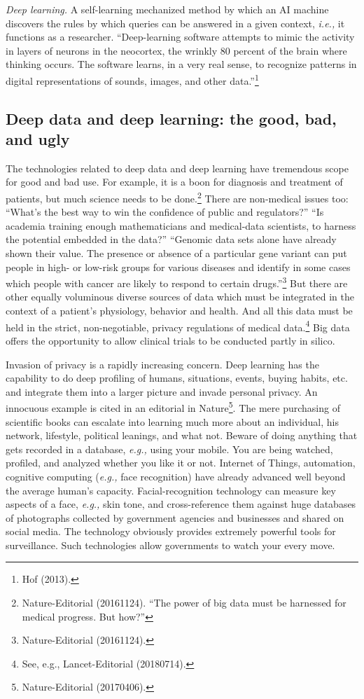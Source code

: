 \begin{multicols}{2}
\textit{Deep learning.} A self-learning mechanized method by which an AI machine discovers the rules by which queries can be answered in a given context, \textit{i.e.,} it functions as a researcher. “Deep-learning software attempts to mimic the activity in layers of neurons in the neocortex, the wrinkly 80 percent of the brain where thinking occurs. The software learns, in a very real sense, to recognize patterns in digital representations of sounds, images, and other data.”\footnote{Hof (2013).}

\subsection*{Deep data and deep learning: the good, bad, and ugly}

\vskip -4pt

The technologies related to deep data and deep learning have tremendous scope for good and bad use. For example, it is a boon for diagnosis and treatment of patients, but much science needs to be done.\footnote{Nature-Editorial (20161124). “The power of big data must be harnessed for medical progress. But how?”}  There are non-medical issues too: “What's the best way to win the confidence of public and regulators?” “Is academia training enough mathematicians and medical-data scientists, to harness the potential embedded in the data?” “Genomic data sets alone have already shown their value. The presence or absence of a particular gene variant can put people in high- or low-risk groups for various diseases and identify in some cases which people with cancer are likely to respond to certain drugs.”\footnote{Nature-Editorial (20161124).}  But there are other equally voluminous diverse sources of data which must be integrated in the context of a patient's physiology, behavior and health. And all this data must be held in the strict, non-negotiable, privacy regulations of medical data.\footnote{See, e.g., Lancet-Editorial (20180714).}  Big data offers the opportunity to allow clinical trials to be conducted partly in silico.

Invasion of privacy is a rapidly increasing concern. Deep learning has the capability to do deep profiling of humans, situations, events, buying habits, etc. and integrate them into a larger picture and invade personal privacy. An innocuous example is cited in an editorial in Nature\footnote{Nature-Editorial (20170406).}. The mere purchasing of scientific books can escalate into learning much more about an individual, his network, lifestyle, political leanings, and what not. Beware of doing anything that gets recorded in a database, \textit{e.g.,} using your mobile. You are being watched, profiled, and analyzed whether you like it or not. Internet of Things, automation, cognitive computing (\textit{e.g.,} face recognition) have already advanced well beyond the average human's capacity. Facial-recognition technology can measure key aspects of a face, \textit{e.g.,} skin tone, and cross-reference them against huge databases of photographs collected by government agencies and businesses and shared on social media. The technology obviously provides extremely powerful tools for surveillance. Such technologies allow governments to watch your every move.


\end{multicols}
